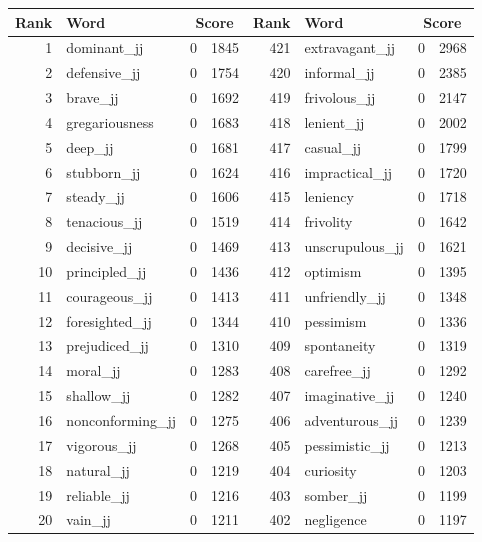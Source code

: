 \begin{table}[tbp]
    \begin{tabular}{| rlr@{.}l | rlr@{.}l |}
    \hline
    \textbf{Rank} & \textbf{Word} & \multicolumn{2}{c|}{\textbf{Score}} & \textbf{Rank} & \textbf{Word} & \multicolumn{2}{c|}{\textbf{Score}} \\
    \hline
    1 & dominant\_jj & 0 & 1845    &    421 & extravagant\_jj & 0 & 2968 \\
    2 & defensive\_jj & 0 & 1754    &    420 & informal\_jj & 0 & 2385 \\
    3 & brave\_jj & 0 & 1692    &    419 & frivolous\_jj & 0 & 2147 \\
    4 & gregariousness & 0 & 1683    &    418 & lenient\_jj & 0 & 2002 \\
    5 & deep\_jj & 0 & 1681    &    417 & casual\_jj & 0 & 1799 \\
    6 & stubborn\_jj & 0 & 1624    &    416 & impractical\_jj & 0 & 1720 \\
    7 & steady\_jj & 0 & 1606    &    415 & leniency & 0 & 1718 \\
    8 & tenacious\_jj & 0 & 1519    &    414 & frivolity & 0 & 1642 \\
    9 & decisive\_jj & 0 & 1469    &    413 & unscrupulous\_jj & 0 & 1621 \\
    10 & principled\_jj & 0 & 1436    &    412 & optimism & 0 & 1395 \\
    11 & courageous\_jj & 0 & 1413    &    411 & unfriendly\_jj & 0 & 1348 \\
    12 & foresighted\_jj & 0 & 1344    &    410 & pessimism & 0 & 1336 \\
    13 & prejudiced\_jj & 0 & 1310    &    409 & spontaneity & 0 & 1319 \\
    14 & moral\_jj & 0 & 1283    &    408 & carefree\_jj & 0 & 1292 \\
    15 & shallow\_jj & 0 & 1282    &    407 & imaginative\_jj & 0 & 1240 \\
    16 & nonconforming\_jj & 0 & 1275    &    406 & adventurous\_jj & 0 & 1239 \\
    17 & vigorous\_jj & 0 & 1268    &    405 & pessimistic\_jj & 0 & 1213 \\
    18 & natural\_jj & 0 & 1219    &    404 & curiosity & 0 & 1203 \\
    19 & reliable\_jj & 0 & 1216    &    403 & somber\_jj & 0 & 1199 \\
    20 & vain\_jj & 0 & 1211    &    402 & negligence & 0 & 1197 \\

\end{tabular}
\end{table}

